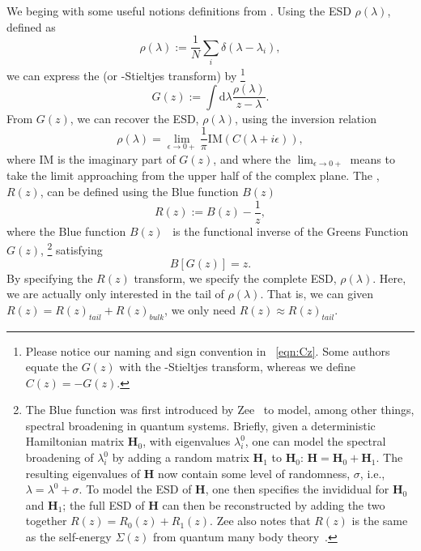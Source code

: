 We beging with some useful notions definitions from \RandomMatrixTheory.
%
Using the ESD $\rho(\lambda)$, defined as
\begin{equation}
\label{eqn:rgo}
\rho(\lambda):=\frac{1}{N}\sum_{i}\delta(\lambda-\lambda_{i})  ,
\end{equation}
%
we can express the \emph{\GreensFunction} (or \emph{\Cauchy}-Stieltjes transform) by%
\footnote{Please notice our naming and sign convention in \EQN~\ref{eqn:Cz}.
Some authors equate the \GreensFunction $G(z)$ with
the \Cauchy-Stieltjes transform, whereas we define $C(z)=-G(z)$.}
\begin{equation}
\label{eqn:Gz}
G(z):=\int \mathrm{d}\lambda \frac{\rho(\lambda)}{z-\lambda} .
\end{equation}
%
From $G(z)$, we can recover the ESD, $\rho(\lambda)$, using the inversion relation
\begin{equation}
\label{eqn:GzInverse}
\rho(\lambda)=\lim_{\epsilon\rightarrow 0+}\frac{1}{\pi}\mathrm{IM}(C(\lambda+i\epsilon))  ,
\end{equation}
where $\mathrm{IM}$ is the imaginary part of $G(z)$, and where the $\lim_{\epsilon\rightarrow 0+}$ means to take the limit approaching from the upper half of the complex plane.
%
The \RTransform, $R(z)$, can be defined using the Blue function $B(z)$ 
\begin{equation}
\label{eqn:Rz}
R(z):=B(z)-\frac{1}{z}  ,
\end{equation}
where the Blue function $B(z)$~\cite{Zee1996} is the functional inverse of the Greens Function $G(z)$,%
\footnote{The Blue function was first introduced by Zee~\cite{Zee1996} to model, among other things, spectral broadening in quantum systems.
Briefly, given a deterministic Hamiltonian matrix $\mathbf{H}_{0}$, with eigenvalues $\lambda^{0}_{i}$,
one can model the spectral broadening of $\lambda^{0}_{i}$ by adding a random matrix $\mathbf{H}_{1}$ to $\mathbf{H}_{0}$:
$\mathbf{H}=\mathbf{H}_{0}+\mathbf{H}_{1}$.  
The resulting eigenvalues of $\mathbf{H}$ now contain some level of randomness, $\sigma$, i.e., $\lambda=\lambda^{0}+\sigma$.  
To model the ESD of $\mathbf{H}$, one then specifies the invididual \RTransforms for $\mathbf{H}_{0}$ and $\mathbf{H}_{1}$; the full ESD of $\mathbf{H}$
can then be reconstructed by adding the two \RTransforms together $R(z)=R_{0}(z)+R_{1}(z)$.
Zee also notes that $R(z)$  is the same as the self-energy $\Sigma(z)$ from quantum many body theory~\cite{Zee1996}.}
satisfying 
\begin{equation}
\label{eqn:GzRelation}
B[G(z)]=z  .
\end{equation}
By specifying the $R(z)$ transform, we specify the complete ESD, $\rho(\lambda)$.
Here, we are actually only interested in the tail of $\rho(\lambda)$.
That is, we can given $R(z)=R(z)_{tail}+R(z)_{bulk}$, we only need $R(z)\approx R(z)_{tail}$.

